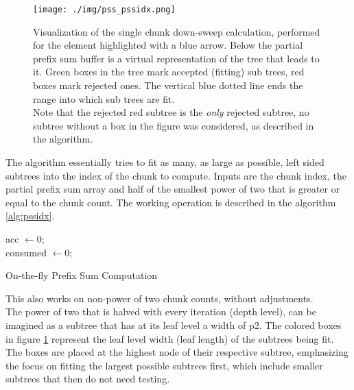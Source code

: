 \documentclass{tudscrreprt}
\begin{document}
				\begin{figure}[!ht]
					\centering
					\texttt{[image: ./img/pss\_pssidx.png]}
					\caption{\label{fig:pss_pssidx}Visualization of the single chunk down-sweep calculation, performed for the element highlighted with a blue arrow. Below the partial prefix sum buffer is a virtual representation of the tree that leads to it. Green boxes in the tree mark accepted (fitting) sub trees, red boxes mark rejected ones. The vertical blue dotted line ends the range into which sub trees are fit. \\ Note that the rejected red subtree is the \emph{only} rejected subtree, no subtree without a box in the figure was considered, as described in the algorithm.}
				\end{figure}
			
				The algorithm essentially tries to fit as many, as large as possible, left sided subtrees into the index of the chunk to compute. Inputs are the chunk index, the partial prefix sum array and half of the smallest power of two that is greater or equal to the chunk count. The working operation is described in the algorithm \ref{alg:pssidx}. \\
				
				\begin{algorithm}[!ht]
					\SetAlgoLined
					acc $\gets 0$; \\
					consumed $\gets 0$; \\
					\caption{\label{alg:pssidx}On-the-fly Prefix Sum Computation}
				\end{algorithm}
			
				This also works on non-power of two chunk counts, without adjustments. \\
				The power of two that is halved with every iteration (depth level), can be imagined as a subtree that has at its leaf level a width of p2. The colored boxes in figure \ref{fig:pss_pssidx} represent the leaf level width (leaf length) of the subtrees being fit. The boxes are placed at the highest node of their respective subtree, emphasizing the focus on fitting the largest possible subtrees first, which include smaller subtrees that then do not need testing. \\
			
\end{document}
